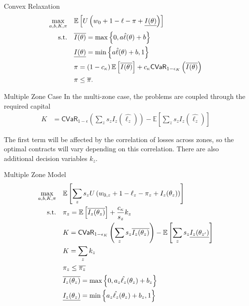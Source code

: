 \documentclass{beamer}
\begin{document}
\begin{frame}{Convex Relaxation}
    \begin{align}
        \max_{a,b,K,\pi} &\quad \mathbb{E} \left [  U\left(w_0 + 1 - \ell - \pi  +  \underline{I(\theta)} \right) \right ]\label{eq-06}\\
        \text{s.t.} & \quad \overline{I(\theta)} = \max \left \{0,a\hat{\ell}(\theta) + b \right \} \nonumber\\
        & \quad \underline{I(\theta)} = \min \left \{a\hat{\ell}(\theta)+b,1 \right \} \nonumber\\
        & \quad \pi = \left (1-c_{\kappa} \right ) \mathbb{E} \left [ \overline{I(\theta)} \right ] + c_{\kappa} {\sf CVaR}_{1-\epsilon_K} \left( \overline{I(\theta)} \right) \label{eq-41}\\
        & \quad \pi \leq \overline{\pi} \nonumber.
  \end{align}
    
\end{frame}

\begin{frame}{Multiple Zone Case}
    In the multi-zone case, the problems are coupled through the required capital
    \begin{align*}
        K &= \textsf{CVaR}_{1-\epsilon} \left ( \sum_z s_z I_z(\hat{\ell_z}) \right ) - \mathbb{E}\left [\sum_z s_z I_z(\hat{\ell_z}) \right ]
    \end{align*}

    The first term will be affected by the correlation of losses across zones, so the optimal contracts will vary depending on this correlation. There are also additional decision variables $k_z$. 
    
\end{frame}

\begin{frame}{Multiple Zone Model}
    \begin{align}
        \max_{a,b,K,\pi} &\quad \mathbb{E}\left [ \sum_z s_z U\left ( w_{0,z} + 1 -\ell_z -\pi_z + I_z(\theta_z) \right ) \right ]\nonumber\\
        \text{s.t.} &\quad \pi_z  = \mathbb{E}\left [ \overline{I_z(\theta_z)} \right ] + \frac{c_{\kappa}}{s_z}  k_z\\
        &\quad K = {\sf CVaR}_{1-\epsilon_K} \left ( \sum_z s_z\overline{I_z(\theta_z)} \right ) - \mathbb{E}\left [ \sum_{z} s_{z}\underline{I_{z}(\theta_{z'})} \right ]\\
        &\quad K = \sum_z k_z\\
        &\quad\pi_z \leq \overline{\pi_z}\\
        &\quad \overline{I_z(\theta_z)} = \max \left \{0,a_z\hat{\ell_z}(\theta_z) + b_z \right \} \nonumber\\
        &\quad\underline{I_z(\theta_z)} = \min \left \{a_z\hat{\ell_z}(\theta_z)+b_z,1 \right \} \nonumber
      \end{align}
\end{frame}
\end{document}

